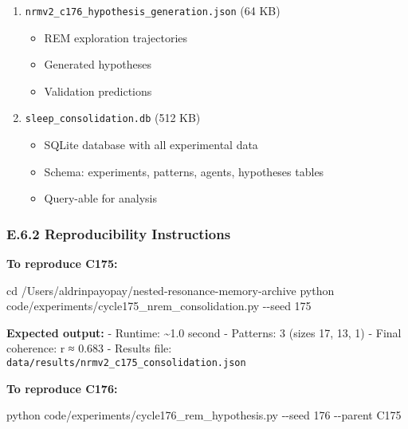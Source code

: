\documentclass[
]{article}
\newenvironment{Shaded}{}{}
\newcommand{\AttributeTok}[1]{\textcolor[rgb]{0.49,0.56,0.16}{#1}}
\newcommand{\BuiltInTok}[1]{\textcolor[rgb]{0.00,0.50,0.00}{#1}}
\newcommand{\ExtensionTok}[1]{#1}
\newcommand{\NormalTok}[1]{#1}
\providecommand{\tightlist}{%
  \setlength{\itemsep}{0pt}\setlength{\parskip}{0pt}}
\begin{document}
\begin{enumerate}
\def\labelenumi{\arabic{enumi}.}
\setcounter{enumi}{1}
\tightlist
\item
  \texttt{nrmv2\_c176\_hypothesis\_generation.json} (64 KB)

  \begin{itemize}
  \tightlist
  \item
    REM exploration trajectories
  \item
    Generated hypotheses
  \item
    Validation predictions
  \end{itemize}
\item
  \texttt{sleep\_consolidation.db} (512 KB)

  \begin{itemize}
  \tightlist
  \item
    SQLite database with all experimental data
  \item
    Schema: experiments, patterns, agents, hypotheses tables
  \item
    Query-able for analysis
  \end{itemize}
\end{enumerate}

\subsubsection{E.6.2 Reproducibility
Instructions}\label{e.6.2-reproducibility-instructions}

\textbf{To reproduce C175:}

\begin{Shaded}
\begin{Highlighting}[]
\BuiltInTok{cd}\NormalTok{ /Users/aldrinpayopay/nested{-}resonance{-}memory{-}archive}
\ExtensionTok{python}\NormalTok{ code/experiments/cycle175\_nrem\_consolidation.py }\AttributeTok{{-}{-}seed}\NormalTok{ 175}
\end{Highlighting}
\end{Shaded}

\textbf{Expected output:} - Runtime: \textasciitilde1.0 second -
Patterns: 3 (sizes 17, 13, 1) - Final coherence: r ≈ 0.683 - Results
file: \texttt{data/results/nrmv2\_c175\_consolidation.json}

\textbf{To reproduce C176:}

\begin{Shaded}
\begin{Highlighting}[]
\ExtensionTok{python}\NormalTok{ code/experiments/cycle176\_rem\_hypothesis.py }\AttributeTok{{-}{-}seed}\NormalTok{ 176 }\AttributeTok{{-}{-}parent}\NormalTok{ C175}
\end{Highlighting}
\end{Shaded}
\end{document}
